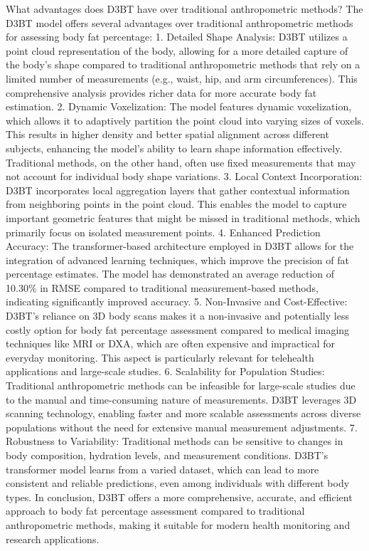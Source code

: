 \documentclass[conference, 12pt]{IEEEtran}
\begin{document}
What advantages does D3BT have over traditional anthropometric methods?
The D3BT model offers several advantages over traditional anthropometric methods for assessing body fat percentage:
1. Detailed Shape Analysis: D3BT utilizes a point cloud representation of the body, allowing for a more detailed capture of the body's shape compared to traditional anthropometric methods that rely on a limited number of measurements (e.g., waist, hip, and arm circumferences). This comprehensive analysis provides richer data for more accurate body fat estimation.
2. Dynamic Voxelization: The model features dynamic voxelization, which allows it to adaptively partition the point cloud into varying sizes of voxels. This results in higher density and better spatial alignment across different subjects, enhancing the model's ability to learn shape information effectively. Traditional methods, on the other hand, often use fixed measurements that may not account for individual body shape variations.
3. Local Context Incorporation: D3BT incorporates local aggregation layers that gather contextual information from neighboring points in the point cloud. This enables the model to capture important geometric features that might be missed in traditional methods, which primarily focus on isolated measurement points.
4. Enhanced Prediction Accuracy: The transformer-based architecture employed in D3BT allows for the integration of advanced learning techniques, which improve the precision of fat percentage estimates. The model has demonstrated an average reduction of 10.30\% in RMSE compared to traditional measurement-based methods, indicating significantly improved accuracy.
5. Non-Invasive and Cost-Effective: D3BT’s reliance on 3D body scans makes it a non-invasive and potentially less costly option for body fat percentage assessment compared to medical imaging techniques like MRI or DXA, which are often expensive and impractical for everyday monitoring. This aspect is particularly relevant for telehealth applications and large-scale studies.
6. Scalability for Population Studies: Traditional anthropometric methods can be infeasible for large-scale studies due to the manual and time-consuming nature of measurements. D3BT leverages 3D scanning technology, enabling faster and more scalable assessments across diverse populations without the need for extensive manual measurement adjustments.
7. Robustness to Variability: Traditional methods can be sensitive to changes in body composition, hydration levels, and measurement conditions. D3BT's transformer model learns from a varied dataset, which can lead to more consistent and reliable predictions, even among individuals with different body types.
In conclusion, D3BT offers a more comprehensive, accurate, and efficient approach to body fat percentage assessment compared to traditional anthropometric methods, making it suitable for modern health monitoring and research applications.
\end{document}
